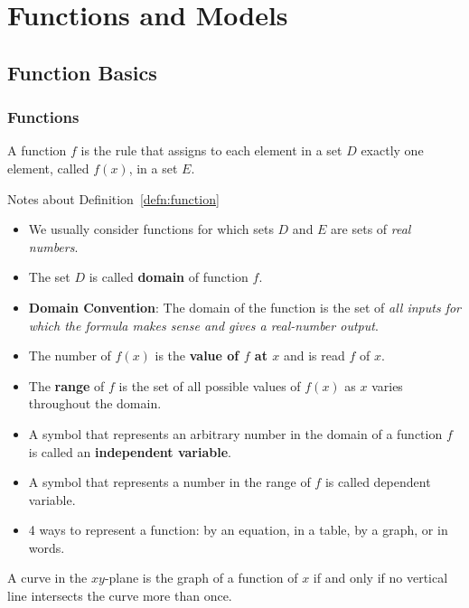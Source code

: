 \chapter{Functions and Models}\label{chap:chap1_FuncsModels}

\section{Function Basics}\label{sec:chap1_func_basics}

\subsection{Functions}\label{subsec:funcs}
\begin{defn}[Function]\label{defn:function}
    A function $f$ is the rule that assigns to each element
    in a set $D$ exactly one element, called $f(x)$, in a set $E$.
\end{defn}

\begin{boxnote}{Notes about Definition~\ref{defn:function}}
    \begin{itemize}
        \item We usually consider functions for which sets $D$ and $E$ are sets of \emph{real numbers}.
        \item The set $D$ is called \textbf{domain} of function $f$.
        \item \textbf{Domain Convention}: The domain of the function is the set of \emph{all inputs for which the formula makes sense and gives a real-number output}.
        \item The number of $f(x)$ is the \textbf{value of $f$ at $x$} and is read $f$ of $x$.
        \item The \textbf{range} of $f$ is the set of all possible values of $f(x)$ as $x$ varies throughout the domain.
        \item A symbol that represents an arbitrary number in the domain of a function $f$ is called an \textbf{independent variable}.
        \item A symbol that represents a number in the range of $f$ is called dependent variable.
        \item 4 ways to represent a function: by an equation, in a table, by a graph, or in words. 
    \end{itemize}
\end{boxnote} 

\begin{thm}
    A curve in the $xy$-plane is the graph of a function of $x$ if
    and only if no vertical line intersects the curve more than once.
\end{thm}

